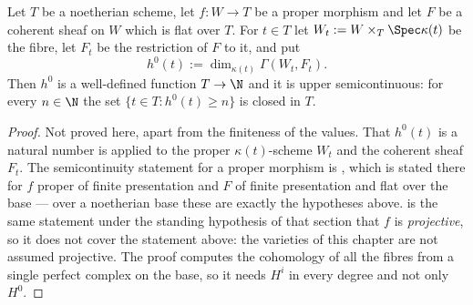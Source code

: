 \begin{proposition}
\label{prop:cube-semicontinuity}
Let $T$ be a noetherian scheme, let $f\colon W\to T$ be a proper morphism and
let $F$ be a coherent sheaf on $W$ which is flat over $T$.  For $t\in T$ let
$W_t:=W\times_T\Spec\kappa(t)$ be the fibre, let $F_t$ be the restriction of
$F$ to it, and put
\[
  h^0(t):=\dim_{\kappa(t)}\Gamma(W_t,F_t).
\]
Then $h^0$ is a well-defined function $T\to\N$ and it is upper
semicontinuous: for every $n\in\N$ the set $\{t\in T:h^0(t)\geq n\}$ is closed
in $T$.
\end{proposition}
\begin{proof}
Not proved here, apart from the finiteness of the values.  That $h^0(t)$ is a
natural number is  applied to the proper
$\kappa(t)$-scheme $W_t$ and the coherent sheaf $F_t$.  The semicontinuity
statement for a proper morphism is , which is stated there
for $f$ proper of finite presentation and $F$ of finite presentation and flat
over the base --- over a noetherian base these are exactly the hypotheses
above.  \cite[III, Theorem 12.8]{Hartshorne} is the same statement under the
standing hypothesis of that section that $f$ is \emph{projective}, so it does
not cover the statement above: the varieties of this chapter are not assumed
projective.  The proof computes the cohomology of all the fibres from
a single perfect complex on the base, so it needs $H^i$ in every degree and
not only $H^0$.
\end{proof}

